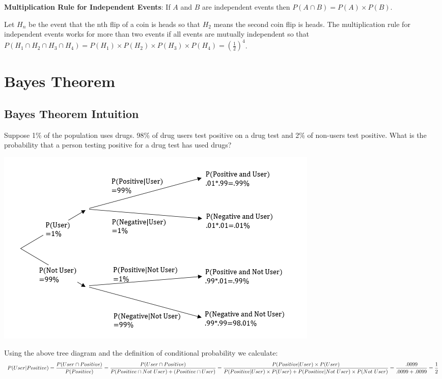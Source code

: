 \documentclass[
]{book}
\theoremstyle{definition}
\theoremstyle{definition}
\theoremstyle{definition}
\theoremstyle{remark}
\begin{document}
\textbf{Multiplication Rule for Independent Events}: If \(A\) and \(B\) are independent events then \(P(A \cap B) = P(A) \times P(B)\).

Let \(H_n\) be the event that the nth flip of a coin is heads so that \(H_2\) means the second coin flip is heads. The multiplication rule for independent events works for more than two events if all events are mutually independent so that \(P(H_1 \cap H_2 \cap H_3 \cap H_4)=P(H_1)\times P(H_2)\times P(H_3)\times P(H_4) = (\frac{1}{2})^4\).

\hypertarget{bayes-theorem}{%
\section{Bayes Theorem}\label{bayes-theorem}}

\hypertarget{bayes-theorem-intuition}{%
\subsection{Bayes Theorem Intuition}\label{bayes-theorem-intuition}}

Suppose 1\% of the population uses drugs. 98\% of drug users test positive on a drug test and 2\% of non-users test positive. What is the probability that a person testing positive for a drug test has used drugs?

\includegraphics{Pictures/03-Probability/BayesTreeSmall.PNG}

Using the above tree diagram and the definition of conditional probability we calculate: \[P(User|Positive) = \frac{P(User \cap Positive)}{P(Positive)}= \\ 
\frac{P(User \cap Positive)}{P(Positive \cap Not \ User) + (Positive \cap User)} =\\  \frac{P(Positive|User) \times P(User)}{P(Positive|User) \times P(User)+P(Positive|Not \ User) \times P(Not \ User)} = \\
\frac{.0099}{.0099+.0099}=\frac{1}{2}\]
\end{document}
